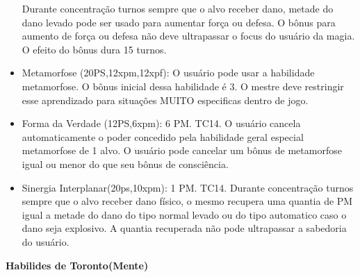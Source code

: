 \begin{itemize}
Durante concentração turnos sempre que o alvo receber dano, metade do dano levado pode ser usado para aumentar força ou defesa. O bônus para aumento de força ou defesa não deve ultrapassar o focus do usuário da magia. O efeito do bônus dura 15 turnos.

\item Metamorfose (20PS,12xpm,12xpf): O usuário pode usar a habilidade metamorfose. O bônus inicial dessa habilidade é 3. O mestre deve restringir esse aprendizado para situações MUITO especificas dentro de jogo.

\item Forma da Verdade (12PS,6xpm): 6 PM. TC14.\newline
O usuário cancela automaticamente o poder concedido pela habilidade geral especial metamorfose de 1 alvo. O usuário pode cancelar um bônus de metamorfose igual ou menor do que seu bônus de consciência.

\item Sinergia Interplanar(20ps,10xpm): 1 PM. TC14. \newline
Durante concentração turnos sempre que o alvo receber dano físico, o mesmo recupera uma quantia de PM igual a metade do dano do tipo normal levado ou do tipo automatico caso o dano seja explosivo. A quantia recuperada não pode ultrapassar a sabedoria do usuário.

\end{itemize}

\textbf{Habilides de Toronto(Mente)}

